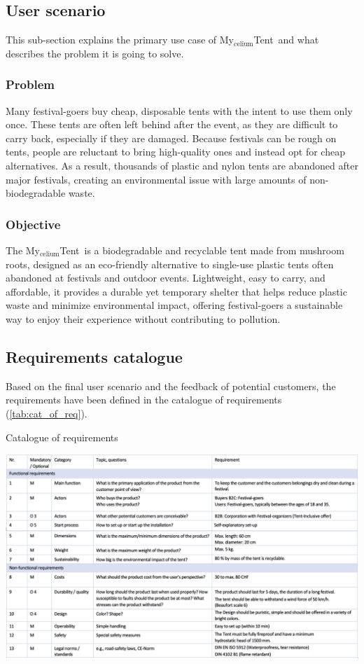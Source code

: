 \documentclass{article}
\newcommand{\myc}{My$_{\text{celium}}$Tent}
\begin{document}
\subsection{User scenario}
This sub-section explains the primary use case of \myc\ and what describes the
problem it is going to solve. 

\subsubsection{Problem}
Many festival-goers buy cheap, disposable tents with the intent to use them only once.
These tents are often left behind after the event, as they are difficult to carry back,
especially if they are damaged. Because festivals can be rough on tents, people are
reluctant to bring high-quality ones and instead opt for cheap alternatives. As a result,
thousands of plastic and nylon tents are abandoned after major festivals, creating an
environmental issue with large amounts of non-biodegradable waste.

\subsubsection{Objective}
The \myc\ is a biodegradable and recyclable tent made from mushroom roots,
designed as an eco-friendly alternative to single-use plastic tents often abandoned at
festivals and outdoor events. Lightweight, easy to carry, and affordable, it provides a
durable yet temporary shelter that helps reduce plastic waste and minimize
environmental impact, offering festival-goers a sustainable way to enjoy their experience
without contributing to pollution.

\subsection{Requirements catalogue}
Based on the final user scenario and the feedback of potential customers, the
requirements have been defined in the catalogue of requirements (\autoref{tab:cat_of_req}).

\begin{table}[ht!]
    \centering
    \caption{Catalogue of requirements}
    \includegraphics[width=\textwidth]{media/req_cat_high_res.png}
    \label{tab:cat_of_req}
\end{table}
\end{document}

